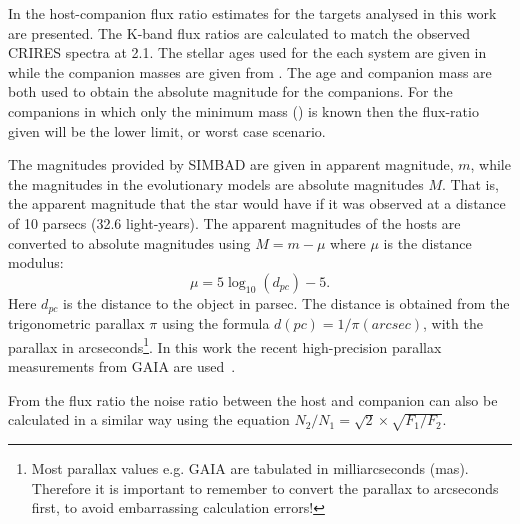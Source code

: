 In  the host-companion flux ratio estimates for the targets analysed in this work are presented. The {K}-band flux ratios are calculated to match the observed {CRIRES} spectra at 2.1\um{}. The stellar ages used for the each system are given in  while the companion masses are given from . The age and companion mass are both used to obtain the absolute magnitude for the companions. For the companions in which only the minimum mass (\mtwosini{}) is known then the flux-ratio given will be the lower limit, or worst case scenario.


The magnitudes provided by {SIMBAD} are given in apparent magnitude, $m$, while the magnitudes in the evolutionary models are absolute magnitudes $M$. That is, the apparent magnitude that the star would have if it was observed at a distance of 10 parsecs (32.6 light-years). The apparent magnitudes of the hosts are converted to absolute magnitudes using \(M = m - \mu\) where \(\mu\) is the distance modulus:
\begin{equation}
\mu = 5 \log_{10}(d_{pc}) -5. \label{eqn:distance_modulus}
\end{equation}
Here $d_{pc}$ is the distance to the object in parsec. The distance is obtained from the trigonometric parallax  $\pi$ using the formula $d(pc) = 1 /\pi(arcsec)$, with the parallax in arcseconds\footnote{Most parallax values e.g. GAIA are tabulated in milliarcseconds (mas). Therefore it is important to remember to convert the parallax to arcseconds first, to avoid embarrassing calculation errors!}. In this work the recent high-precision parallax measurements from GAIA are used~\citet{collaboration_gaia_2018}.

From the flux ratio the noise ratio between the host and companion can also be calculated in a similar way using the equation \(N_{2}/N_{1} = \sqrt{2} \times\sqrt{F_{1}/F_{2}}\).


